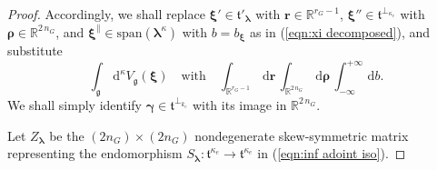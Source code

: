 \documentclass[12pt,a4paper]{article}
\theoremstyle{plain}
\theoremstyle{definition}
\begin{document}
\begin{proof}
Accordingly, we shall replace $\boldsymbol{\xi}'\in 
\mathfrak{t}'_{\boldsymbol{\lambda}}$ with
$\mathbf{r}\in \mathbb{R}^{r_G-1}$,
$\boldsymbol{\xi}''\in \mathfrak{t}^{\perp_{\kappa_e}}$
with $\boldsymbol{\rho}\in \mathbb{R}^{2\,n_G}$,
and $\boldsymbol{\xi}^{\|}\in 
\mathrm{span}\left(\boldsymbol{\lambda}^\kappa\right)$
with $b=b_{\boldsymbol{\xi}}$ as in (\ref{eqn:xi decomposed}),
and substitute 
$$
\int_{\mathfrak{g}}\,
\mathrm{d}^\kappa V_{\mathfrak{g}}(\boldsymbol{\xi})\quad
\text{with}\quad 
\int_{\mathbb{R}^{r_G-1}}\,\mathrm{d}\mathbf{r}\,
\int_{\mathbb{R}^{2\,n_G}}\,\mathrm{d}\boldsymbol{\rho}
\,\int_{-\infty}^{+\infty}\,\mathrm{d}b.
$$
%
We shall simply identify $\boldsymbol{\gamma}
\in \mathfrak{t}^{\perp_{k_e}}$
with its image in $\mathbb{R}^{2\,n_G}$.

Let $Z_{\boldsymbol{\lambda}}$ be the $(2n_G)\times (2 n_G)$
nondegenerate skew-symmetric matrix representing the 
endomorphism $S_{\boldsymbol{\lambda}}:\mathfrak{t}^{\kappa_e}
\rightarrow \mathfrak{t}^{\kappa_e}$ in (\ref{eqn:inf adoint iso}).



\end{proof}
\end{document}
